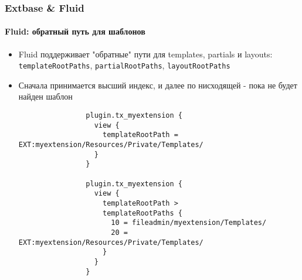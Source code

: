 \begin{frame}[fragile]
	\frametitle{Extbase \& Fluid}
	\framesubtitle{Fluid: обратный путь для шаблонов}

	\lstset{
		basicstyle=\tiny\ttfamily
	}

	\begin{itemize}
		\item Fluid поддерживает "обратные" пути для templates, partials и layouts:\newline
			\smaller\texttt{templateRootPaths}, \texttt{partialRootPaths}, \texttt{layoutRootPaths}\normalsize
		\item Сначала принимается высший индекс, и далее по нисходящей - пока не будет найден шаблон

			\begin{lstlisting}
				plugin.tx_myextension {
				  view {
				    templateRootPath = EXT:myextension/Resources/Private/Templates/
				  }
				}

				plugin.tx_myextension {
				  view {
				    templateRootPath >
				    templateRootPaths {
				      10 = fileadmin/myextension/Templates/
				      20 = EXT:myextension/Resources/Private/Templates/
				    }
				  }
				}
			\end{lstlisting}

	\end{itemize}

\end{frame}


